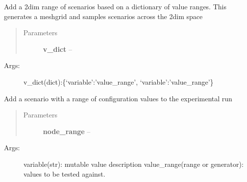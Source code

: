\documentclass[letterpaper,10pt,english]{sphinxmanual}
\begin{document}
\begin{fulllineitems}
\begin{fulllineitems}
\begin{description}
\end{description}

\end{fulllineitems}


\begin{fulllineitems}
\label{index:polybos.ExperimentManager.add_variable_2_range_scenarios}
Add a 2dim range of scenarios based on a dictionary of value ranges.
This generates a meshgrid and samples scenarios across the 2dim space
\begin{quote}\begin{description}
\item[{Parameters}] \leavevmode
\textbf{v\_dict} -- 

\end{description}\end{quote}
\begin{description}
\item[{Args:}] \leavevmode
v\_dict(dict):\{`variable':'value\_range', `variable':'value\_range'\}

\end{description}

\end{fulllineitems}


\begin{fulllineitems}
\label{index:polybos.ExperimentManager.add_variable_node_scenario}
Add a scenario with a range of configuration values to the experimental run
\begin{quote}\begin{description}
\item[{Parameters}] \leavevmode
\textbf{node\_range} -- 

\end{description}\end{quote}
\begin{description}
\item[{Args:}] \leavevmode
variable(str): mutable value description
value\_range(range or generator): values to be tested against.

\end{description}


\end{fulllineitems}
\end{fulllineitems}
\end{document}
